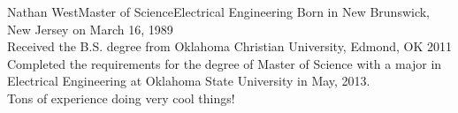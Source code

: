 \newpage
 \begin{vita}{Nathan West}{Master of Science}{Electrical Engineering} %
  Born in New Brunswick, New Jersey on March 16, 1989
  \\ Received the B.S. degree  from Oklahoma Christian University, Edmond, OK 2011\\
Completed the requirements for the degree of Master of Science with a major in Electrical Engineering at Oklahoma State University in May, 2013. 
 \\ Tons of experience doing very cool things!
  \end{vita}
